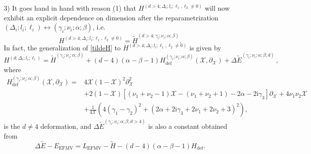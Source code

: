 \documentclass{article}
\def \Dg {\Delta}
\def \ds {\partial}
\def \ag {\alpha}
\def \bg {\beta}
\def \cg {\gamma}
\begin{document}
\begin{itemize}
\item[3)] It goes hand in hand with reason (1) that $H^{(d>4;\Dg_i;l_i;\ell_1,\ell_2\neq 0)}$ will now exhibit an explicit dependence on dimension after the reparametrization $(\Dg_i;l_i;\ell_i) \leftrightarrow (\cg_i;\nu_i;\ag;\bg)$, i.e.
\begin{equation}
       H^{(d>4;\Dg_i;l_i;\ell_1,\ell_2\neq 0)} = \tilde{H}^{(d>4;\cg_i;\nu_i;\ag;\bg)}. 
\end{equation}
In fact, the generalization of \eqref{tildeH} to $H^{(d>4;\Dg_i;l_i;\ell_1,\ell_2\neq 0)}$ is given by 
\begin{equation}
    H^{(d;\Dg_i;l_i;\ell_i)} = \tilde{H}^{(\cg_i;\nu_i;\ag;\bg)} + (d-4) (\ag-\bg-1) H_{\mathrm{def}}^{(\cg_i;\nu_i;\ag;\bg)}(\mathcal{X},\ds_\mathcal{X}) + \Delta \tilde{E}^{(\cg_i;\nu_i;\ag;\bg;d)}\,, 
    \label{tildeHd}
\end{equation}
where
\begin{align*}
    H_{\mathrm{def}}^{(\cg_i;\nu_i;\ag;\bg)}(\mathcal{X},\ds_\mathcal{X}) =& 4 \mathcal{X}(1-\mathcal{X})^2\ds_\mathcal{X}^2\\
    &+ 2(1-\mathcal{X})\left[ (\nu_1+\nu_2-1)\mathcal{X} -(\nu_1+\nu_2+1) -2\ag -2\mathrm{i}\cg_3 \right]\ds_\mathcal{X} + 4 \nu_1\nu_2 \mathcal{X} \\
    & +\frac{1}{4\mathcal{X}} \left( 4 \left(\gamma _1-\gamma _2\right)^2+\left(2 \alpha +2 \mathrm{i} \gamma _3+2 \nu _1+2 \nu _2+3\right)^2\right),
\end{align*}
is the $d \neq 4$ deformation, and $\Delta \tilde{E}^{(\cg_i;\nu_i;\ag;\bg;d>4)}$ is also a constant obtained from 
\begin{equation}
   \Delta \tilde{E} - E_{\mathrm{EFMV}} =L_{\mathrm{EFMV}}-\tilde{H}-(d-4)(\ag-\bg-1) H_{\mathrm{def}}.
\end{equation}
\end{itemize}
\end{document}
